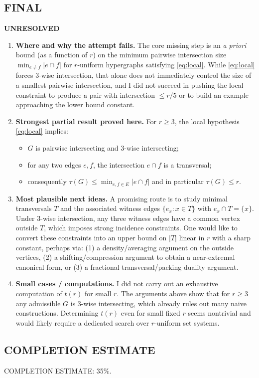\subsection*{FINAL}

\textbf{UNRESOLVED}

\begin{enumerate}[label=(\roman*),leftmargin=2.5em]
\item \textbf{Where and why the attempt fails.}
The core missing step is an \emph{a priori} bound (as a function of $r$) on the minimum pairwise intersection size $\min_{e\ne f}|e\cap f|$ for $r$-uniform hypergraphs satisfying \eqref{eq:local}. While \eqref{eq:local} forces 3-wise intersection, that alone does not immediately control the size of a smallest pairwise intersection, and I did not succeed in pushing the local constraint to produce a pair with intersection $\le r/5$ or to build an example approaching the lower bound constant.

\item \textbf{Strongest partial result proved here.}
For $r\ge 3$, the local hypothesis \eqref{eq:local} implies:
\begin{itemize}[leftmargin=2.2em]
\item $G$ is pairwise intersecting and 3-wise intersecting;
\item for any two edges $e,f$, the intersection $e\cap f$ is a transversal;
\item consequently $\tau(G)\le \min_{e,f\in E}|e\cap f|$ and in particular $\tau(G)\le r$.
\end{itemize}

\item \textbf{Most plausible next ideas.}
A promising route is to study minimal transversals $T$ and the associated witness edges $\{e_x:x\in T\}$ with $e_x\cap T=\{x\}$.
Under 3-wise intersection, any three witness edges have a common vertex outside $T$, which imposes strong incidence constraints. One would like to convert these constraints into an upper bound on $|T|$ linear in $r$ with a sharp constant, perhaps via:
(1) a density/averaging argument on the outside vertices,
(2) a shifting/compression argument to obtain a near-extremal canonical form,
or (3) a fractional transversal/packing duality argument.

\item \textbf{Small cases / computations.}
I did not carry out an exhaustive computation of $t(r)$ for small $r$. The arguments above show that for $r\ge 3$ any admissible $G$ is 3-wise intersecting, which already rules out many naive constructions. Determining $t(r)$ even for small fixed $r$ seems nontrivial and would likely require a dedicated search over $r$-uniform set systems.
\end{enumerate}

\subsection*{COMPLETION ESTIMATE}

COMPLETION ESTIMATE: 35\%.

